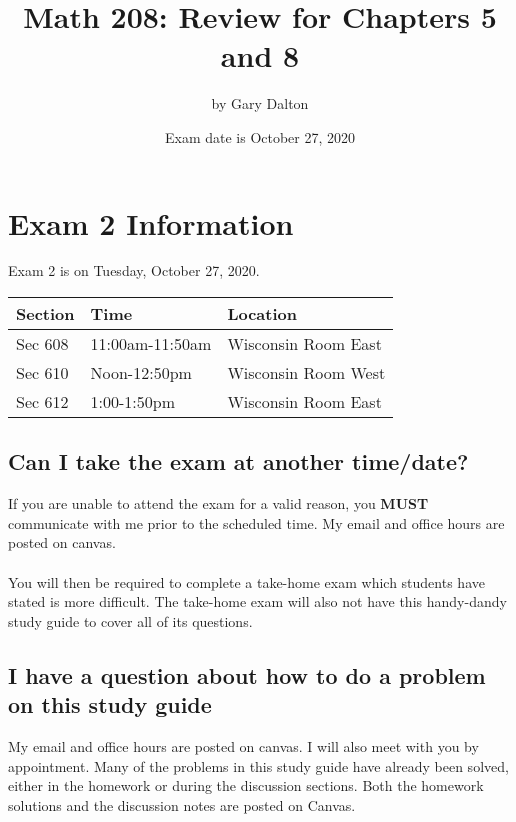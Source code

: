 \documentclass[12pt]{article}
\begin{document}
\title{Math 208: Review for Chapters 5 and 8}
\author{by Gary Dalton}
\date{Exam date is October 27, 2020}
\maketitle

\section*{Exam 2 Information}

Exam 2 is on Tuesday, October 27, 2020.

\begin{table}[h]
\begin{tabular}{lll}
\hline
\textbf{Section} & \textbf{Time} & \textbf{Location}   \\ \hline
Sec 608          & 11:00am-11:50am  & Wisconsin Room East \\ \hline
Sec 610          & Noon-12:50pm   	& Wisconsin Room West  \\ \hline
Sec 612          & 1:00-1:50pm   	& Wisconsin Room East \\ \hline
\end{tabular}
\end{table}

\subsection*{Can I take the exam at another time/date?}
If you are unable to attend the exam for a valid reason, you \textbf{MUST} communicate with me prior to the scheduled time. My email and office hours are posted on canvas.
\\\\
You will then be required to complete a take-home exam which students have stated is more difficult. The take-home exam will also not have this handy-dandy study guide to cover all of its questions.

\subsection*{I have a question about how to do a problem on this study guide}
My email and office hours are posted on canvas. I will also meet with you by appointment. Many of the problems in this study guide have already been solved, either in the homework or during the discussion sections. Both the homework solutions and the discussion notes are posted on Canvas.
\end{document}
